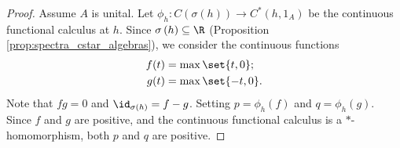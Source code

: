 \begin{proof}
  Assume $A$ is unital. Let $\phi_h\colon C\left( \sigma\left( h \right) \right)\rightarrow C^{\ast}\left( h,1_A \right)$ be the continuous functional calculus at $h$. Since $\sigma\left( h \right)\subseteq \R$ (Proposition \ref{prop:spectra_cstar_algebras}), we consider the continuous functions
  \begin{align*}
    f(t) &= \max\set{t,0};\\
    g(t) &= \max\set{-t,0}.
  \end{align*}
  Note that $fg = 0$ and $\id_{\sigma\left( h \right)} = f-g$. Setting $p = \phi_h(f)$ and $q = \phi_h(g)$. Since $f$ and $g$ are positive, and the continuous functional calculus is a $\ast$-homomorphism, both $p$ and $q$ are positive.\newline


\end{proof}
